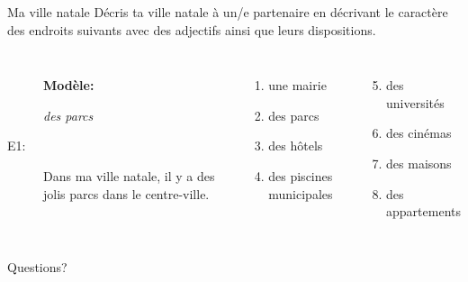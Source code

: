 \documentclass{beamer}
\begin{document}
  \begin{frame}{Ma ville natale}
    Décris ta ville natale à un/e partenaire en décrivant le caractère des endroits suivants avec des adjectifs ainsi que leurs dispositions. \\
    \vspace{0.25cm}
    \begin{columns}[t]
        \begin{description}
          \item[] \textbf{Modèle:}
          \item[] \emph{des parcs}
          \item[E1:] Dans ma ville natale, il y a des jolis parcs dans le centre-ville.
        \end{description}
        \begin{enumerate}
          \item une mairie
          \item des parcs
          \item des hôtels
          \item des piscines municipales
        \end{enumerate}
        \begin{enumerate}
          \setcounter{enumi}{4}
          \item des universités
          \item des cinémas
          \item des maisons
          \item des appartements
        \end{enumerate}
    \end{columns}
  \end{frame}

  \begin{frame}{}
    \begin{center}
      \Large Questions?
    \end{center}
  \end{frame}
\end{document}
